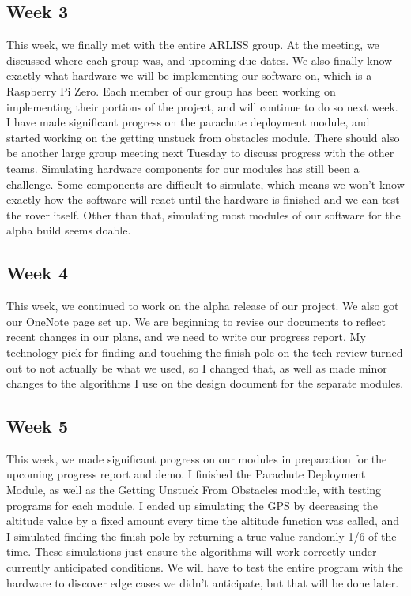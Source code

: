 \documentclass[10pt,letterpaper,onecolumn,draftclsnofoot,journal]{IEEEtran}
\begin{document}
\subsection{Week 3}
This week, we finally met with the entire ARLISS group. At the meeting, we discussed where each group was, and upcoming due dates. We also finally know exactly what hardware we will be implementing our software on, which is a Raspberry Pi Zero. Each member of our group has been working on implementing their portions of the project, and will continue to do so next week. I have made significant progress on the parachute deployment module, and started working on the getting unstuck from obstacles module. There should also be another large group meeting next Tuesday to discuss progress with the other teams. Simulating hardware components for our modules has still been a challenge. Some components are difficult to simulate, which means we won't know exactly how the software will react until the hardware is finished and we can test the rover itself. Other than that, simulating most modules of our software for the alpha build seems doable.
\subsection{Week 4}
This week, we continued to work on the alpha release of our project. We also got our OneNote page set up. We are beginning to revise our documents to reflect recent changes in our plans, and we need to write our progress report. My technology pick for finding and touching the finish pole on the tech review turned out to not actually be what we used, so I changed that, as well as made minor changes to the algorithms I use on the design document for the separate modules. 
\subsection{Week 5}
This week, we made significant progress on our modules in preparation for the upcoming progress report and demo. I finished the Parachute Deployment Module, as well as the Getting Unstuck From Obstacles module, with testing programs for each module. I ended up simulating the GPS by decreasing the altitude value by a fixed amount every time the altitude function was called, and I simulated finding the finish pole by returning a true value randomly 1/6 of the time. These simulations just ensure the algorithms will work correctly under currently anticipated conditions. We will have to test the entire program with the hardware to discover edge cases we didn’t anticipate, but that will be done later.
\end{document}
